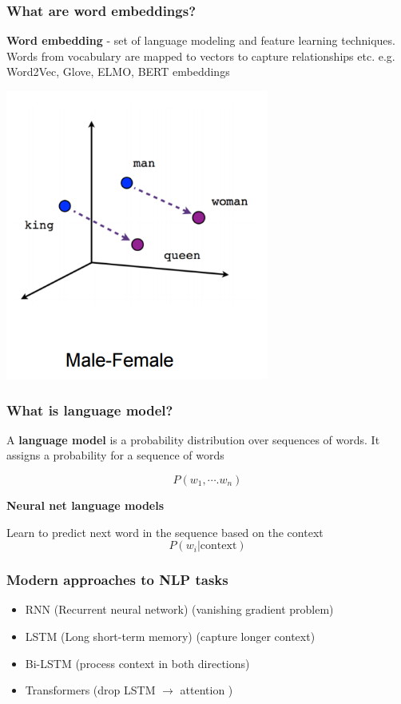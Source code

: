 \documentclass{beamer}
\begin{document}
\begin{frame}
    \frametitle{What are word embeddings?}
    \textbf{Word embedding} - set of language modeling and feature learning techniques. Words
    from vocabulary are mapped to vectors to capture relationships etc. e.g. Word2Vec, Glove, ELMO, BERT embeddings
    \begin{center}
    \includegraphics[scale=0.4]{images/embeddings.png}
    \end{center}
\end{frame}

\begin{frame}

\frametitle{What is language model?}

A \textbf{language model} is a probability distribution over sequences of words. It assigns a probability for a sequence of words

$$
    P(w_1, \cdots. w_{n})
$$

\textbf{Neural net language models}

Learn to predict next word in the sequence based on the context
$$
P(w_{i}|{\mathrm  {context}})
$$

\end{frame}

\begin{frame}
    \frametitle{Modern approaches to NLP tasks}
    \begin{itemize}
        \item RNN (Recurrent neural network) (vanishing gradient problem)
        \item LSTM (Long short-term memory) \parencite{hochreiter1997long} (capture longer context)
        \item Bi-LSTM (process context in both directions)
        \item Transformers (drop LSTM $\to$ attention \parencite{vaswani2017attention})
    \end{itemize}
\end{frame}
\end{document}
